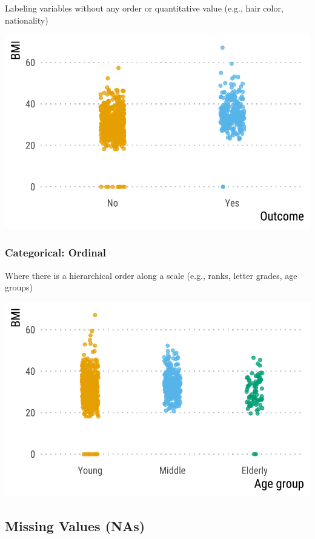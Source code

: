 \documentclass[
  letterpaper,
  DIV=11,
  numbers=noendperiod]{scrreprt}
\begin{document}
Labeling variables without any order or quantitative value (e.g., hair
color, nationality)

\includegraphics{./intro_files/figure-pdf/unnamed-chunk-6-1.pdf}

\hypertarget{categorical-ordinal}{%
\subsubsection{\texorpdfstring{\textbf{Categorical:
Ordinal}}{Categorical: Ordinal}}\label{categorical-ordinal}}

Where there is a hierarchical order along a scale (e.g., ranks, letter
grades, age groups)

\includegraphics{./intro_files/figure-pdf/unnamed-chunk-7-1.pdf}

\hypertarget{missing-values-nas}{%
\subsection{Missing Values (NAs)}\label{missing-values-nas}}
\end{document}
